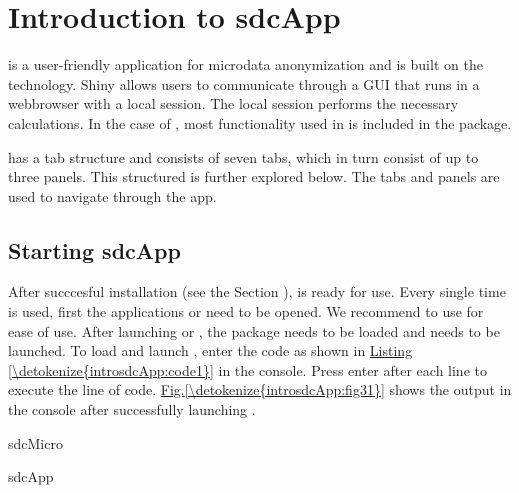 \documentclass[letterpaper,10pt,english]{sphinxmanual}
\begin{document}
\chapter{Introduction to sdcApp}
\label{\detokenize{introsdcApp::doc}}\label{\detokenize{introsdcApp:introduction-to-sdcapp}}
 is a user-friendly application for microdata anonymization
and is built on the 
technology. Shiny allows users to
communicate through a GUI that runs in a webbrowser with a local  session. The local
 session performs the necessary calculations. In the case of , most functionality
used in  is included in the 
package.

 has a tab structure and consists of seven tabs, which in turn consist of
up to three panels. This structured is further explored below.
The tabs and panels are used to navigate through the app.


\section{Starting sdcApp}
\label{\detokenize{introsdcApp:starting-sdcapp}}
After succcesful installation (see the Section ),
 is ready for use. Every single time  is used,
first the applications  or  need to be opened. We recommend to use 
for ease of use. After launching  or ,
the  package needs to be loaded and  needs to be launched.
To load  and launch , enter the code as shown in \hyperref[\detokenize{introsdcApp:code1}]{Listing \ref{\detokenize{introsdcApp:code1}}} in the  console.
Press enter after each line to execute the line of code. \hyperref[\detokenize{introsdcApp:fig31}]{Fig.\@ \ref{\detokenize{introsdcApp:fig31}}} shows the
output in the  console after successfully launching .

\def\sphinxLiteralBlockLabel{\label{\detokenize{introsdcApp:code1}}}
%
\begin{sphinxVerbatim}[commandchars=\\\{\},numbers=left,firstnumber=1,stepnumber=1]
sdcMicro

sdcApp
\end{sphinxVerbatim}
\end{document}
